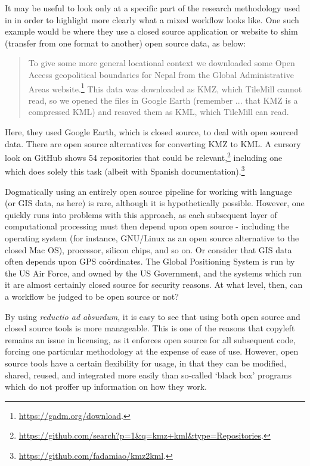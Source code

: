 It may be useful to look only at a specific part of the research methodology used in \citep{gawne2016mapmaking} in order to highlight more clearly what a mixed workflow looks like. One such example would be where they use a closed source application or website to shim (transfer from one format to another) open source data, as below:

\begin{quote}
To give some more general locational context we downloaded some Open Access geopolitical boundaries for Nepal from the Global Administrative Areas website.\footnote{\href{https://gadm.org/download}{https://gadm.org/download}. } This data was downloaded as KMZ, which TileMill cannot read, so we opened the files in Google Earth (remember ... that KMZ is a compressed KML) and resaved them as KML, which TileMill can read. \citep[228]{gawne2016mapmaking}
\end{quote}

Here, they used Google Earth, which is closed source, to deal with open sourced data. There are open source alternatives for converting KMZ to KML. A cursory look on GitHub shows 54 repositories that could be relevant,\footnote{\href{https://github.com/search?p=1&q=kmz+kml&type=Repositories}{https://github.com/search?p=1\&q=kmz+kml\&type=Repositories}. } including one which does solely this task (albeit with Spanish documentation).\footnote{\href{https://github.com/fadamiao/kmz2kml}{https://github.com/fadamiao/kmz2kml}. }

Dogmatically using an entirely open source pipeline for working with language (or GIS data, as here) is rare, although it is hypothetically possible. However, one quickly runs into problems with this approach, as each subsequent layer of computational processing must then depend upon open source - including the operating system (for instance, GNU/Linux as an open source alternative to the closed Mac OS), processor, silicon chips, and so on. Or consider that GIS data often depends upon GPS co\"{o}rdinates. The Global Positioning System is run by the US Air Force, and owned by the US Government, and the systems which run it are almost certainly closed source for security reasons. At what level, then, can a workflow be judged to be open source or not?

By using {\it reductio ad absurdum}, it is easy to see that using both open source and closed source tools is more manageable. This is one of the reasons that copyleft remains an issue in licensing, as it enforces open source for all subsequent code, forcing one particular methodology at the expense of ease of use. However, open source tools have a certain flexibility for usage, in that they can be modified, shared, reused, and integrated more easily than so-called `black box' programs which do not proffer up information on how they work.

